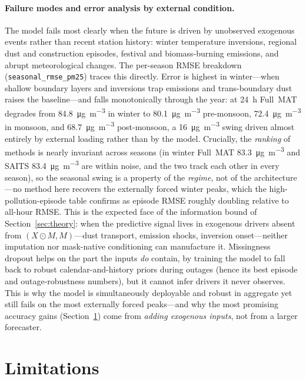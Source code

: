\documentclass[review,3p,times]{elsarticle}
\newcommand{\ugm}{\si{\micro\gram\per\cubic\metre}}
\begin{document}
\paragraph{Failure modes and error analysis by external condition.}
The model fails most clearly when the future is driven by unobserved exogenous
events rather than recent station history: winter temperature inversions,
regional dust and construction episodes, festival and biomass-burning emissions,
and abrupt meteorological changes. The per-season RMSE breakdown
(\texttt{seasonal\_rmse\_pm25}) traces this directly. Error is highest in winter---when
shallow boundary layers and inversions trap emissions and trans-boundary dust
raises the baseline---and falls monotonically through the year: at \SI{24}{\hour}
Full~MAT degrades from \SI{84.8}{\ugm} in winter to \SI{80.1}{\ugm} pre-monsoon,
\SI{72.4}{\ugm} in monsoon, and \SI{68.7}{\ugm} post-monsoon, a \SI{16}{\ugm}
swing driven almost entirely by external loading rather than by the model.
Crucially, the \emph{ranking} of methods is nearly invariant across seasons
(in winter Full~MAT \SI{83.3}{\ugm} and SAITS \SI{83.4}{\ugm} are within noise,
and the two track each other in every season), so the seasonal swing is a
property of the \emph{regime}, not of the architecture---no method here recovers
the externally forced winter peaks, which the high-pollution-episode table
confirms as episode RMSE roughly doubling relative to all-hour RMSE. This is the
expected face of the information bound of Section~\ref{sec:theory}: when the
predictive signal lives in exogenous drivers absent from $(X\odot M,M)$---dust
transport, emission shocks, inversion onset---neither imputation nor mask-native
conditioning can manufacture it. Missingness dropout helps on the part the inputs
\emph{do} contain, by training the model to fall back to robust
calendar-and-history priors during outages (hence its best episode and
outage-robustness numbers), but it cannot infer drivers it never observes. This
is why the model is simultaneously deployable and robust in aggregate yet still
fails on the most externally forced peaks---and why the most promising accuracy
gains (Section~\ref{sec:limitations}) come from \emph{adding exogenous inputs},
not from a larger forecaster.

\section{Limitations}
\label{sec:limitations}
\end{document}
